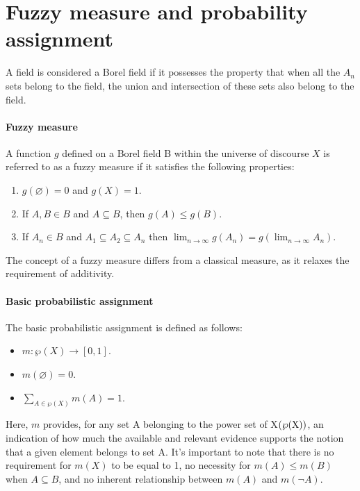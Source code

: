 \section{Fuzzy measure and probability assignment}

\begin{definition}
    A field is considered a Borel field if it possesses the property that when all the $A_n$ sets belong to the field, the union and intersection of these sets also belong to the field. 
\end{definition}

\paragraph*{Fuzzy measure}
A function $g$ defined on a Borel field B within the universe of discourse $X$ is referred to as a fuzzy measure if it satisfies the following properties:
\begin{enumerate}
    \item $g(\varnothing)=0$ and $g(X)=1$.
    \item If $A,B \in B$ and $A \subseteq B$, then $g(A) \leq g(B)$.
    \item If $A_n \in B$ and $A_1 \subseteq A_2 \subseteq A_n$ then $\lim_{n \to \infty}g(A_n)=g\left(\lim_{n \to \infty}A_n\right)$.
\end{enumerate}
The concept of a fuzzy measure differs from a classical measure, as it relaxes the requirement of additivity.

\paragraph*{Basic probabilistic assignment}
The basic probabilistic assignment is defined as follows:
\begin{itemize}
    \item $m:\wp(X) \rightarrow [0,1]$.
    \item $m(\varnothing)=0$.
    \item $\sum_{A \in \wp(X)}m(A)=1$.
\end{itemize}
Here, $m$ provides, for any set A belonging to the power set of X$(\wp(\textnormal{X}))$, an indication of how much the available and relevant evidence supports the notion that a given element belongs to set A.
It's important to note that there is no requirement for $m(X)$ to be equal to 1, no necessity for $m(A) \leq m(B)$ when $A\subseteq B$, and no inherent relationship between $m(A)$ and $m(\lnot A)$.